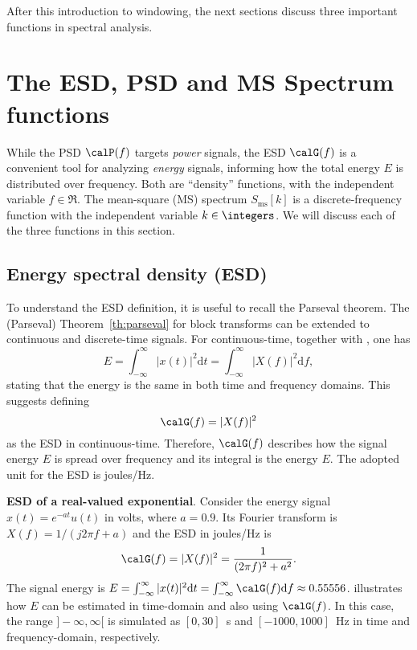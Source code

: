 After this introduction to windowing, the next sections discuss three important functions in spectral analysis.

\section{The ESD, PSD and MS Spectrum functions}

While the PSD $\calP(f)$ targets \emph{power} signals, the ESD $\calG(f)$ is a convenient tool for analyzing \emph{energy} signals, informing how the total energy $E$ is distributed over frequency. Both are ``density'' functions, with the independent variable $f \in \Re$. The mean-square (MS) spectrum $S_{\textrm{ms}}[k]$ is a discrete-frequency function with the independent variable $k \in \integers$. We will discuss each of the three functions in this section.
 
\subsection{Energy spectral density (ESD)}
\label{sec:esd}

To understand the ESD definition, it is useful to recall the Parseval theorem.
The (Parseval) Theorem~\ref{th:parseval} %
for block transforms can be extended to continuous and discrete-time signals. For continuous-time, together with , one has
\begin{equation}
E = \int_{-\infty}^{\infty} |x(t)|^2 \textrm{d}t = \int_{-\infty}^{\infty} |X(f)|^2 \textrm{d}f,
\label{eq:parseval_ct}
\end{equation}
stating that the energy is the same in both time and frequency domains. This suggests defining
\begin{equation}
\calG(f) = |X(f)|^2
\label{eq:esd_definition}
\end{equation}
 as the ESD in continuous-time. Therefore, $\calG(f)$ describes how the signal energy $E$ is spread over frequency and its integral is the energy $E$. The adopted unit for the ESD is joules/Hz.

\bExample \textbf{ESD of a real-valued exponential}.
Consider the energy signal $x(t)= e^{-at}u(t)$ in volts, where $a=0.9$. Its Fourier transform is $X(f) = 1/(j2 \pi f + a)$ and the ESD in joules/Hz is
\[
\calG(f) = |X(f)|^2 = \frac{1}{(2 \pi f)^2 + a^2}.
\]
The signal energy is $E = \int_{-\infty}^{\infty} |x(t)|^2 \textrm{d}t = \int_{-\infty}^{\infty} \calG(f) \textrm{d}f \approx 0.55556$.
 illustrates how $E$ can be estimated in time-domain and also using $\calG(f)$.
In this case, the range $]-\infty,\infty[$ is simulated as $[0,30]$~s and $[-1000,1000]$~Hz in time and frequency-domain, respectively.

